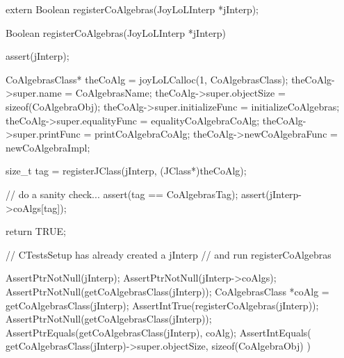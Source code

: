 \startCHeader
extern Boolean registerCoAlgebras(JoyLoLInterp *jInterp);
\stopCHeader
{}

\startCCode
Boolean registerCoAlgebras(JoyLoLInterp *jInterp) {
  assert(jInterp);
  
  CoAlgebrasClass* theCoAlg    =
    joyLoLCalloc(1, CoAlgebrasClass);
  theCoAlg->super.name           = CoAlgebrasName;
  theCoAlg->super.objectSize     = sizeof(CoAlgebraObj);
  theCoAlg->super.initializeFunc = initializeCoAlgebras;
  theCoAlg->super.equalityFunc   = equalityCoAlgebraCoAlg;
  theCoAlg->super.printFunc      = printCoAlgebraCoAlg;
  theCoAlg->newCoAlgebraFunc     = newCoAlgebraImpl;
  
  size_t tag =
    registerJClass(jInterp, (JClass*)theCoAlg);

  // do a sanity check...
  assert(tag == CoAlgebrasTag);
  assert(jInterp->coAlgs[tag]);

  return TRUE;
}
\stopCCode


\startCTest
  // CTestsSetup has already created a jInterp
  // and run registerCoAlgebras
  
  AssertPtrNotNull(jInterp);
  AssertPtrNotNull(jInterp->coAlgs);
  AssertPtrNotNull(getCoAlgebrasClass(jInterp));
  CoAlgebrasClass *coAlg =
    getCoAlgebrasClass(jInterp);
  AssertIntTrue(registerCoAlgebras(jInterp));
  AssertPtrNotNull(getCoAlgebrasClass(jInterp));
  AssertPtrEquals(getCoAlgebrasClass(jInterp), coAlg);
  AssertIntEquals(
    getCoAlgebrasClass(jInterp)->super.objectSize,
    sizeof(CoAlgebraObj)
  )
\stopCTest
\stopTestCase
\stopTestSuite
